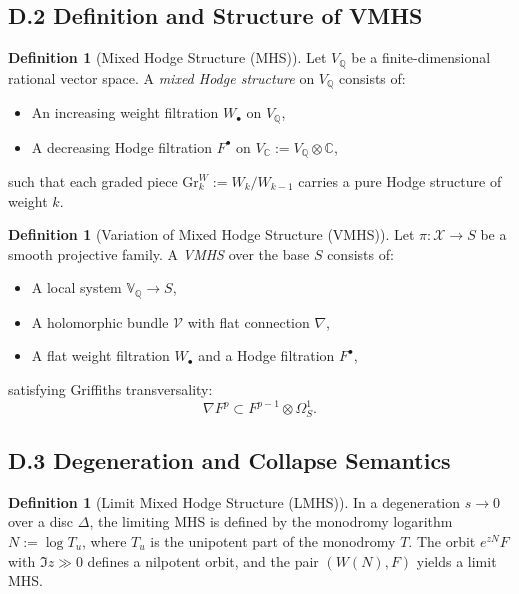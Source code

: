 \documentclass[11pt]{article}
\theoremstyle{definition}
\newtheorem{definition}[theorem]{Definition}
\begin{document}
\subsection*{D.2 Definition and Structure of VMHS}

\begin{definition}[Mixed Hodge Structure (MHS)]
Let \( V_{\mathbb{Q}} \) be a finite-dimensional rational vector space. A \emph{mixed Hodge structure} on \( V_{\mathbb{Q}} \) consists of:
\begin{itemize}
    \item An increasing weight filtration \( W_\bullet \) on \( V_{\mathbb{Q}} \),
    \item A decreasing Hodge filtration \( F^\bullet \) on \( V_{\mathbb{C}} := V_{\mathbb{Q}} \otimes \mathbb{C} \),
\end{itemize}
such that each graded piece \( \mathrm{Gr}^W_k := W_k / W_{k-1} \) carries a pure Hodge structure of weight \( k \).
\end{definition}

\begin{definition}[Variation of Mixed Hodge Structure (VMHS)]
Let \( \pi : \mathcal{X} \to S \) be a smooth projective family. A \emph{VMHS} over the base \( S \) consists of:
\begin{itemize}
    \item A local system \( \mathbb{V}_{\mathbb{Q}} \to S \),
    \item A holomorphic bundle \( \mathcal{V} \) with flat connection \( \nabla \),
    \item A flat weight filtration \( W_\bullet \) and a Hodge filtration \( F^\bullet \),
\end{itemize}
satisfying Griffiths transversality:
\[
\nabla F^p \subset F^{p-1} \otimes \Omega^1_S.
\]
\end{definition}

\subsection*{D.3 Degeneration and Collapse Semantics}

\begin{definition}[Limit Mixed Hodge Structure (LMHS)]
In a degeneration \( s \to 0 \) over a disc \( \Delta \), the limiting MHS is defined by the monodromy logarithm \( N := \log T_u \), where \( T_u \) is the unipotent part of the monodromy \( T \). The orbit \( e^{zN} F \) with \( \Im z \gg 0 \) defines a nilpotent orbit, and the pair \( (W(N), F) \) yields a limit MHS.
\end{definition}
\end{document}
